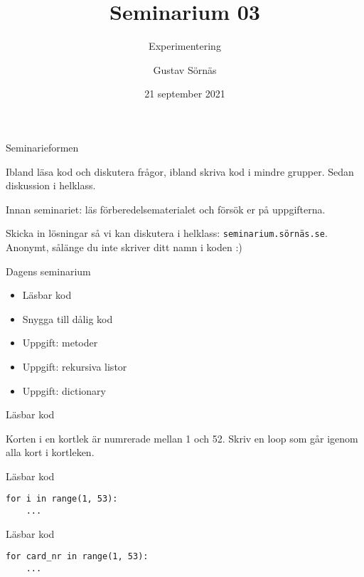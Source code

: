 \documentclass{beamer}
\title{Seminarium 03}
\subtitle{Experimentering}
\date{21 september 2021}
\author{Gustav Sörnäs}
\begin{document}
  \frame{\titlepage}

  \begin{frame}{Seminarieformen}

    Ibland läsa kod och diskutera frågor, ibland skriva kod i mindre grupper.
    Sedan diskussion i helklass.

    Innan seminariet: läs förberedelsematerialet och försök er på uppgifterna.

    Skicka in lösningar så vi kan diskutera i helklass:
    \texttt{seminarium.sörnäs.se}. Anonymt, sålänge du inte skriver ditt namn i
    koden :)

  \end{frame}

  \begin{frame}{Dagens seminarium}

    \begin{itemize}
      \item Läsbar kod
      \item Snygga till dålig kod
      \item Uppgift: metoder
      \item Uppgift: rekursiva listor
      \item Uppgift: dictionary
    \end{itemize}

  \end{frame}

  \begin{frame}{Läsbar kod}

    Korten i en kortlek är numrerade mellan 1 och 52. Skriv en loop som går
    igenom alla kort i kortleken.

  \end{frame}

  \begin{frame}[fragile]{Läsbar kod}

    \begin{verbatim}
for i in range(1, 53):
    ...
    \end{verbatim}

  \end{frame}

  \begin{frame}[fragile]{Läsbar kod}

    \begin{verbatim}
for card_nr in range(1, 53):
    ...
    \end{verbatim}

  \end{frame}
\end{document}
